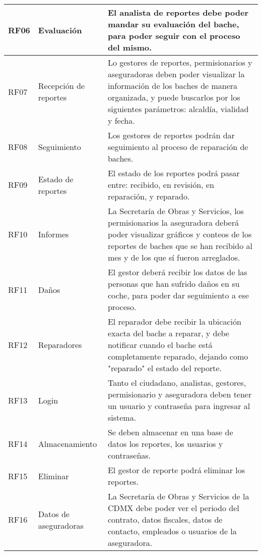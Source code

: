 \begin{longtable}{|m{1.5cm}|m{3.5cm}|m{7cm}|}
        RF06 & Evaluación & El analista de reportes debe poder mandar su evaluación del bache, para poder seguir con el proceso del mismo.\\ \hline
        
        RF07 & Recepción de reportes & Lo gestores de reportes, permisionarios y aseguradoras deben poder visualizar la información de los baches de manera organizada, y puede buscarlos por los siguientes parámetros: alcaldía, vialidad y fecha.  \\ \hline
        
        RF08 & Seguimiento & Los gestores de reportes podrán dar seguimiento al proceso de reparación de baches. \\ \hline
        
        RF09 & Estado de reportes & El estado de los reportes podrá pasar entre: recibido, en revisión, en reparación, y reparado.   \\ \hline
        
        RF10 & Informes & La Secretaría de Obras y Servicios, los permisionarios la aseguradora deberá poder visualizar gráficos y conteos de los reportes de baches que se han recibido al mes y de los que sí fueron arreglados. \\ \hline
        
        RF11 & Daños & El gestor deberá recibir los datos de las personas que han sufrido daños en su coche, para poder dar seguimiento a ese proceso. \\\hline
        
        RF12 & Reparadores & El reparador debe recibir la ubicación exacta del bache a reparar, y debe notificar cuando el bache está completamente reparado, dejando como "reparado" el estado del reporte. \\\hline
        
        RF13 & Login & Tanto el ciudadano, analistas, gestores, permisionario y aseguradora deben tener un usuario y contraseña para ingresar al sistema. \\ \hline
        
        RF14 & Almacenamiento & Se deben almacenar en una base de datos los reportes,  los usuarios y contraseñas. \\ \hline
        
        RF15 & Eliminar & El gestor de reporte podrá eliminar los reportes. \\ \hline
        
        RF16 & Datos de aseguradoras & La Secretaría de Obras y Servicios de la CDMX debe poder ver el periodo del contrato, datos fiscales, datos de contacto, empleados o usuarios de la aseguradora.  \\ \hline
        

\end{longtable}
